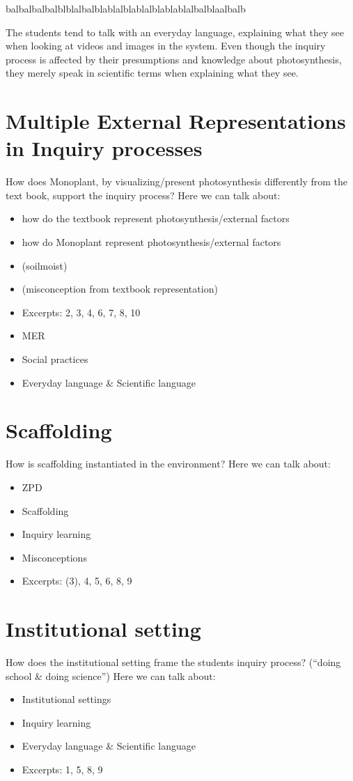 balbalbalbalblblalbalblablalblablalblablablalbalblaalbalb

The students tend to talk with an everyday language, explaining what they see when looking at videos and images in the system. Even though the inquiry process is affected by their presumptions and knowledge about photosynthesis, they merely speak in scientific terms when explaining what they see. 



\section{Multiple External Representations in Inquiry processes}
How does Monoplant, by visualizing/present photosynthesis differently from the text book, support the inquiry process? 
Here we can talk about: 
\begin{itemize}
\item{how do the textbook represent photosynthesis/external factors}
\item{how do Monoplant represent photosynthesis/external factors}
\item{ (soilmoist)}
\item{ (misconception from textbook representation)}
\item{Excerpts: 2, 3, 4, 6, 7, 8, 10}
\item{MER}
\item{Social practices}
\item{Everyday language \& Scientific language}
\end{itemize}




\section{Scaffolding}
How is scaffolding instantiated in the environment?
Here we can talk about: 
\begin{itemize}
\item{ZPD}
\item{Scaffolding}
\item{Inquiry learning}
\item{Misconceptions}
\item{Excerpts: (3), 4, 5, 6, 8, 9}
\end{itemize}



\section{Institutional setting}
How does the institutional setting frame the students inquiry process? (“doing school \& doing science”)
Here we can talk about: 
\begin{itemize}
\item{Institutional settings}
\item{Inquiry learning}
\item{Everyday language \& Scientific language}
\item{Excerpts: 1, 5, 8, 9}
\end{itemize}
